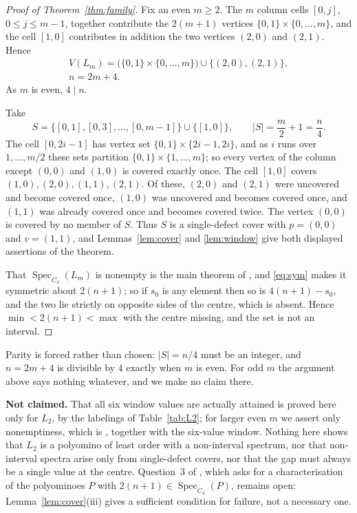 \documentclass[11pt]{amsart}
\DeclareMathOperator{\Spec}{Spec}
\begin{document}
\begin{proof}[Proof of Theorem~\ref{thm:family}]
Fix an even $m\ge2$. The $m$ column cells $[0,j]$, $0\le j\le m-1$, together
contribute the $2(m+1)$ vertices $\{0,1\}\times\{0,\ldots,m\}$, and the cell
$[1,0]$ contributes in addition the two vertices $(2,0)$ and $(2,1)$. Hence
\[
\begin{gathered}
  V(L_m)=\bigl(\{0,1\}\times\{0,\ldots,m\}\bigr)\cup\bigl\{(2,0),(2,1)\bigr\},\\
  n=2m+4 .
\end{gathered}
\]
As $m$ is even, $4\mid n$.

Take
\[
  S=\bigl\{[0,1],[0,3],\ldots,[0,m-1]\bigr\}\cup\bigl\{[1,0]\bigr\},
  \qquad |S|=\frac m2+1=\frac n4 .
\]
The cell $[0,2i-1]$ has vertex set $\{0,1\}\times\{2i-1,2i\}$, and as $i$ runs
over $1,\ldots,m/2$ these sets partition $\{0,1\}\times\{1,\ldots,m\}$; so
every vertex of the column except $(0,0)$ and $(1,0)$ is covered exactly once.
The cell $[1,0]$ covers $(1,0),(2,0),(1,1),(2,1)$. Of these, $(2,0)$ and
$(2,1)$ were uncovered and become covered once, $(1,0)$ was uncovered and
becomes covered once, and $(1,1)$ was already covered once and becomes covered
twice. The vertex $(0,0)$ is covered by no member of $S$. Thus $S$ is a
single-defect cover with $p=(0,0)$ and $v=(1,1)$, and
Lemmas~\ref{lem:cover} and \ref{lem:window} give both displayed assertions of
the theorem.

That $\Spec_{C_4}(L_m)$ is nonempty is the main theorem of \cite{CLE}, and
\eqref{eq:sym} makes it symmetric about $2(n+1)$; so if $s_0$ is any element
then so is $4(n+1)-s_0$, and the two lie strictly on opposite sides of the
centre, which is absent. Hence $\min<2(n+1)<\max$ with the centre missing, and
the set is not an interval.
\end{proof}

Parity is forced rather than chosen: $|S|=n/4$ must be an integer, and
$n=2m+4$ is divisible by $4$ exactly when $m$ is even. For odd $m$ the
argument above says nothing whatever, and we make no claim there.

\medskip
\noindent\textbf{Not claimed.}
That all six window values are actually attained is proved here only for
$L_2$, by the labelings of Table~\ref{tab:L2}; for larger even $m$ we assert
only nonemptiness, which is \cite{CLE}, together with the six-value window.
Nothing here shows that $L_2$ is a polyomino of least order with a
non-interval spectrum, nor that non-interval spectra arise only from
single-defect covers, nor that the gap must always be a single value at the
centre. Question~3 of \cite[Section~5]{CLE}, which asks for a
characterisation of the polyominoes $P$ with $2(n+1)\in\Spec_{C_4}(P)$,
remains open: Lemma~\ref{lem:cover}(iii) gives a sufficient condition for
failure, not a necessary one.
\end{document}
